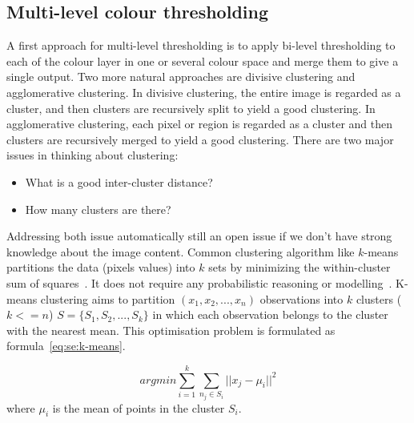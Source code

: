 
\subsection{Multi-level colour thresholding} %
\label{sub:ap:muli_threshold}

A first approach for multi-level thresholding is to apply bi-level thresholding to each of the colour layer in one or several colour space and merge them to give a single output.
Two more natural approaches are divisive clustering and agglomerative clustering.
In divisive clustering, the entire image is regarded as a cluster, and then clusters are recursively split to yield a good clustering.
In agglomerative clustering, each pixel or region is regarded as a cluster and then clusters are recursively merged to yield a good clustering.
There are two major issues in thinking about clustering:
\begin{itemize}
	\item What is a good inter-cluster distance?
	\item How many clusters are there?
\end{itemize}
Addressing both issue automatically still an open issue if we don't have strong knowledge about the image content.
Common clustering algorithm like $k$-means partitions the data (pixels values) into $k$ sets by minimizing the within-cluster sum of squares~\cite{PonceForsyth2012}.
It does not require any probabilistic reasoning or modelling~\cite{Bishop2006PRM}.
K-means clustering aims to partition $(x_1, x_2, ...,x_n)$ observations into $k$ clusters ($k <= n$) $S=\{S_1, S_2, ..., S_k\}$ in which each observation belongs to the cluster with the nearest mean.
This optimisation problem is formulated as formula~\ref{eq:se:k-means}.

\begin{equation}
	arg min \sum\limits_{i=1}^k \sum\limits_{n_j \in S_i} ||x_j - \mu_i||^2
	\label{eq:se:k-means}
\end{equation}
where $\mu_i$ is the mean of points in the cluster $S_i$.













